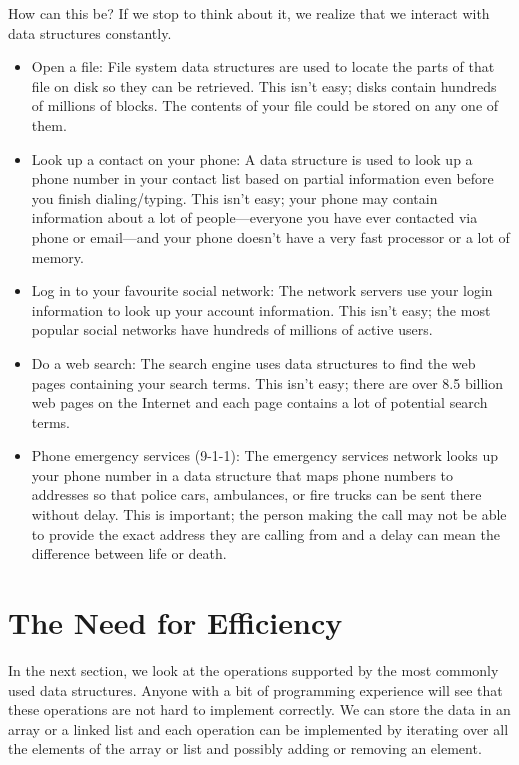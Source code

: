 How can this be?  If we stop to think about it, we realize that we interact with data structures constantly.
\begin{itemize}
  \item  Open a file: File system  data structures are used to locate the parts of that file on disk so they can be retrieved.  This isn't easy; disks contain hundreds of millions of blocks.  The contents of your file could be stored on any one of them.
  \item Look up a contact on your phone:  A data structure is used to look up a phone number in your contact list  based on partial information even before you finish dialing/typing.  This isn't easy; your phone may contain information about a lot of people---everyone you have ever contacted via phone or email---and your phone doesn't have a very fast processor or a lot of memory.
  \item Log in to your favourite social network:  The network servers use your login information to look up your account information.  This isn't easy; the most popular social networks have hundreds of millions of active users.
  \item Do a web search:  The search engine uses data structures to find the web pages containing your search terms.  This isn't easy; there are over 8.5 billion web pages on the Internet and each page contains a lot of potential search terms.
  \item Phone emergency services (9-1-1):  The emergency services network looks up your phone number in a data structure that maps phone numbers to addresses so that police cars, ambulances, or fire trucks can be sent there without delay. This is important;  the person making the call may not be able to provide the exact address they are calling from and a delay can mean the difference between life or death.
\end{itemize}

\section{The Need for Efficiency}

In the next section, we look at the operations supported by the most commonly used data structures.  Anyone with a bit of programming experience will see that these operations are not hard to implement correctly.  We can store the data in an array or a linked list and each operation can be implemented by iterating over all the elements of the array or list and possibly adding or removing an element.

